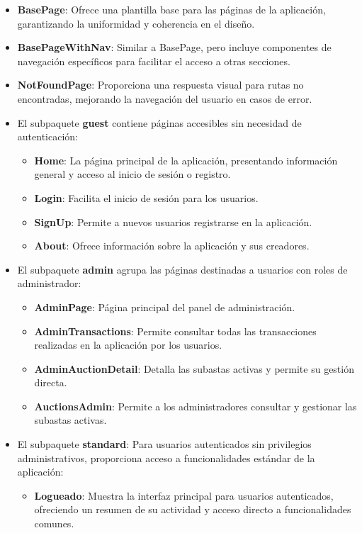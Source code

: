 \begin{itemize}
\begin{itemize}
\begin{itemize}
    \item \textbf{BasePage}: Ofrece una plantilla base para las páginas de la aplicación, garantizando la uniformidad y coherencia en el diseño.
    \item \textbf{BasePageWithNav}: Similar a BasePage, pero incluye componentes de navegación específicos para facilitar el acceso a otras secciones.
    \item \textbf{NotFoundPage}: Proporciona una respuesta visual para rutas no encontradas, mejorando la navegación del usuario en casos de error.
    \item El subpaquete \textbf{guest} contiene páginas accesibles sin necesidad de autenticación:
    \begin{itemize}
        \item \textbf{Home}: La página principal de la aplicación, presentando información general y acceso al inicio de sesión o registro.
        \item \textbf{Login}: Facilita el inicio de sesión para los usuarios.
        \item \textbf{SignUp}: Permite a nuevos usuarios registrarse en la aplicación.
        \item \textbf{About}: Ofrece información sobre la aplicación y sus creadores.
    \end{itemize}
    \item El subpaquete \textbf{admin} agrupa las páginas destinadas a usuarios con roles de administrador:
    \begin{itemize}
        \item \textbf{AdminPage}: Página principal del panel de administración.
        \item \textbf{AdminTransactions}: Permite consultar todas las transacciones realizadas en la aplicación por los usuarios.
        \item \textbf{AdminAuctionDetail}: Detalla las subastas activas y permite su gestión directa.
        \item \textbf{AuctionsAdmin}: Permite a los administradores consultar y gestionar las subastas activas.
    \end{itemize}
    \item El subpaquete \textbf{standard}: Para usuarios autenticados sin privilegios administrativos, proporciona acceso a funcionalidades estándar de la aplicación:
    \begin{itemize}
        \item \textbf{Logueado}: Muestra la interfaz principal para usuarios autenticados, ofreciendo un resumen de su actividad y acceso directo a funcionalidades comunes.

\end{itemize}
\end{itemize}
\end{itemize}
\end{itemize}
